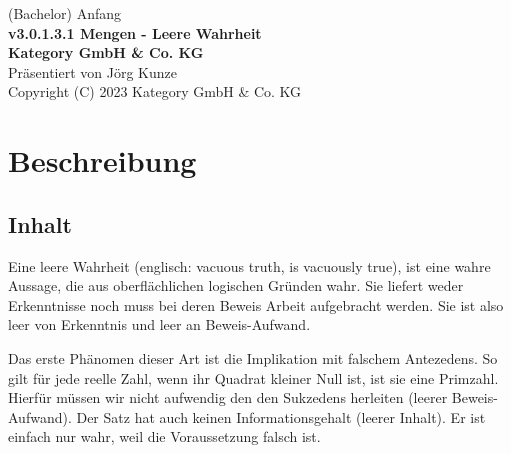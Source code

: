 \documentclass[a4paper]{amsart}
\theoremstyle{definition}
\begin{document}
\begin{titlepage}
\centering
{\huge
(Bachelor) Anfang\\[1cm]
\textbf{v3.0.1.3.1 Mengen - Leere Wahrheit}
}\\[1cm]

\textbf{Kategory GmbH \& Co. KG}\\
Präsentiert von Jörg Kunze\\
Copyright (C) 2023 Kategory GmbH \& Co. KG

\end{titlepage}

%

\newpage

\section*{Beschreibung}

\subsection*{Inhalt}
Eine leere Wahrheit (englisch: vacuous truth, is vacuously true), ist eine wahre Aussage, die aus oberflächlichen logischen Gründen wahr. Sie liefert weder Erkenntnisse noch muss bei deren Beweis Arbeit aufgebracht werden. Sie ist also leer von Erkenntnis und leer an Beweis-Aufwand.

Das erste Phänomen dieser Art ist die Implikation mit falschem Antezedens. So gilt für jede reelle Zahl, wenn ihr Quadrat kleiner Null ist, ist sie eine Primzahl. Hierfür müssen wir nicht aufwendig den den Sukzedens herleiten (leerer Beweis-Aufwand). Der Satz hat auch keinen Informationsgehalt (leerer Inhalt). Er ist einfach nur wahr, weil die Voraussetzung falsch ist.
\end{document}
